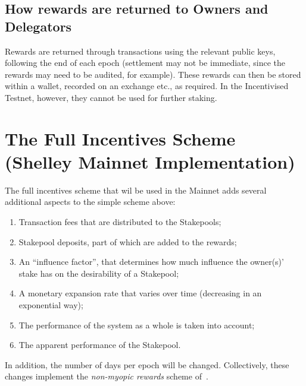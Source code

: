 \documentclass[11pt,a4paper,dvipsnames,twosided,final]{article}
\newcommand{\khcomment}[1]{\todo[color=blue!20]{KH: #1}}
\begin{document}
\subsection{How rewards are returned to Owners and Delegators}

Rewards are returned through transactions using the relevant public keys, following the end
of each epoch (settlement may not be immediate, since the rewards may need to be audited, for example).
These rewards can then be stored within a wallet, recorded on an exchange etc., as required.
In the Incentivised Testnet, however, they cannot be used for further staking.
\khcomment{JC/MG to expand}

\clearpage
\section{The Full Incentives  Scheme (Shelley Mainnet Implementation)}
\label{sec:Mainnet}

The full incentives scheme that wil be used in the Mainnet adds several additional aspects to the
simple scheme above:

\begin{enumerate}
\item
  Transaction fees that are distributed to the Stakepools;
\item
  Stakepool deposits, part of which are added to the rewards;
\item
  An ``influence factor'', that determines how much influence the owner(s)' stake has on
  the desirability of a Stakepool;
\item
  A monetary expansion rate that varies over time (decreasing in an exponential way);
\item
  The performance of the system as a whole is taken into account;
\item
  The apparent performance of the Stakepool.
\end{enumerate}

\noindent
In addition, the number of days per epoch will be changed.  Collectively, these changes implement the \emph{non-myopic rewards} scheme of~\cite{delegation_design}.
\end{document}
